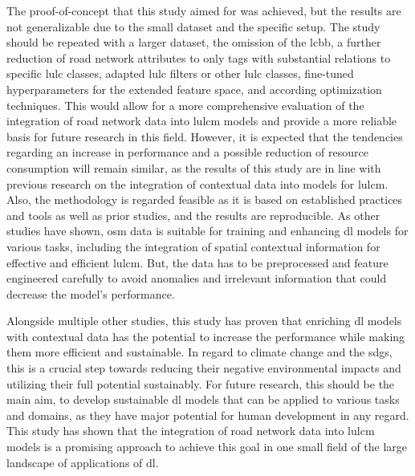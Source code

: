 The proof-of-concept that this study aimed for was achieved, but the results are not generalizable due to the small dataset and the specific setup. The study should be repeated with a larger dataset, the omission of the \gls{lcbb}, a further reduction of road network attributes to only tags with substantial relations to specific \gls{lulc} classes, adapted \gls{lulc} filters or other \gls{lulc} classes, fine-tuned hyperparameters for the extended feature space, and according optimization techniques. This would allow for a more comprehensive evaluation of the integration of road network data into \gls{lulcm} models and provide a more reliable basis for future research in this field. However, it is expected that the tendencies regarding an increase in performance and a possible reduction of resource consumption will remain similar, as the results of this study are in line with previous research on the integration of contextual data into models for \gls{lulcm}. Also, the methodology is regarded feasible as it is based on established practices and tools as well as prior studies, and the results are reproducible. As other studies have shown, \gls{osm} data is suitable for training and enhancing \gls{dl} models for various tasks, including the integration of spatial contextual information for effective and efficient \gls{lulcm}. But, the data has to be preprocessed and feature engineered carefully to avoid anomalies and irrelevant information that could decrease the model's performance.

Alongside multiple other studies, this study has proven that enriching \gls{dl} models with contextual data has the potential to increase the performance while making them more efficient and sustainable. In regard to climate change and the \glspl{sdg}, this is a crucial step towards reducing their negative environmental impacts and utilizing their full potential sustainably. For future research, this should be the main aim, to develop sustainable \gls{dl} models that can be applied to various tasks and domains, as they have major potential for human development in any regard. This study has shown that the integration of road network data into \gls{lulcm} models is a promising approach to achieve this goal in one small field of the large landscape of applications of \gls{dl}.